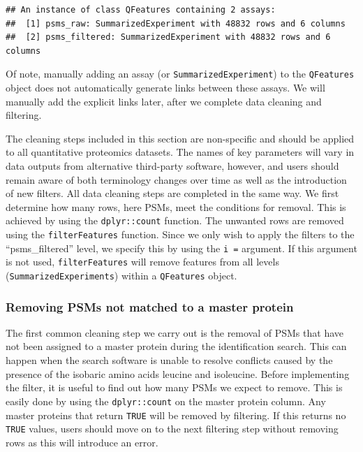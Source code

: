 \documentclass[9pt,a4paper,]{extarticle}
\begin{document}
\begin{verbatim}
## An instance of class QFeatures containing 2 assays:
##  [1] psms_raw: SummarizedExperiment with 48832 rows and 6 columns 
##  [2] psms_filtered: SummarizedExperiment with 48832 rows and 6 columns
\end{verbatim}

Of note, manually adding an assay (or \texttt{SummarizedExperiment}) to the \texttt{QFeatures}
object does not automatically generate links between these assays. We will
manually add the explicit links later, after we complete data cleaning and
filtering.

The cleaning steps included in this section are non-specific and should be applied
to all quantitative proteomics datasets. The names of key parameters will vary in
data outputs from alternative third-party software, however, and users should
remain aware of both terminology changes over time as well as the introduction
of new filters. All data cleaning steps are completed in the same way. We first
determine how many rows, here PSMs, meet the conditions for removal. This is
achieved by using the \texttt{dplyr::count} function. The unwanted rows are removed
using the \texttt{filterFeatures} function. Since we only wish to apply the filters to
the ``psms\_filtered'' level, we specify this by using the \texttt{i\ =} argument. If this
argument is not used, \texttt{filterFeatures} will remove features from all levels
(\texttt{SummarizedExperiments}) within a \texttt{QFeatures} object.

\subsubsection{Removing PSMs not matched to a master protein}\label{removing-psms-not-matched-to-a-master-protein}

The first common cleaning step we carry out is the removal of PSMs that have not
been assigned to a master protein during the identification search. This can
happen when the search software is unable to resolve conflicts caused by the
presence of the isobaric amino acids leucine and isoleucine. Before implementing
the filter, it is useful to find out how many PSMs we expect to remove. This is
easily done by using the \texttt{dplyr::count} on the master protein column. Any master
proteins that return \texttt{TRUE} will be removed by filtering. If this returns
no \texttt{TRUE} values, users should move on to the next filtering step without
removing rows as this will introduce an error.
\end{document}

